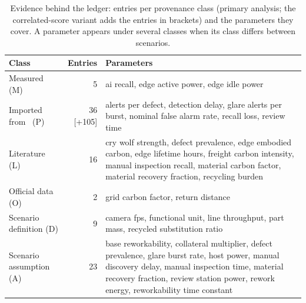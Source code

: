 \begin{table}[!t]
\centering
\scriptsize
\caption{Evidence behind the ledger: entries per provenance class (primary analysis; the correlated-score variant adds the entries in brackets) and the parameters they cover. A parameter appears under several classes when its class differs between scenarios.}
\label{tab:evidence}
\setlength{\tabcolsep}{3pt}
\begin{tabular}{@{}lr>{\raggedright\arraybackslash}p{}@{}}
\toprule
Class & Entries & Parameters \\
\midrule
Measured (M) & 5 & ai recall, edge active power, edge idle power \\
Imported from~\cite{sengar2026paperA} (P) & 36 [+105] & alerts per defect, detection delay, glare alerts per burst, nominal false alarm rate, recall loss, review time \\
Literature (L) & 16 & cry wolf strength, defect prevalence, edge embodied carbon, edge lifetime hours, freight carbon intensity, manual inspection recall, material carbon factor, material recovery fraction, recycling burden \\
Official data (O) & 2 & grid carbon factor, return distance \\
Scenario definition (D) & 9 & camera fps, functional unit, line throughput, part mass, recycled substitution ratio \\
Scenario assumption (A) & 23 & base reworkability, collateral multiplier, defect prevalence, glare burst rate, host power, manual discovery delay, manual inspection time, material recovery fraction, review station power, rework energy, reworkability time constant \\
\bottomrule
\end{tabular}
\end{table}
